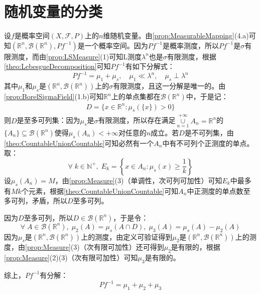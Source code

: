 \section{随机变量的分类}

设$f$是概率空间$(X,\mathscr{F},P)$上的$n$维随机变量。由\cref{prop:MeasurableMapping}(4.a)可知$(\mathbb{R}^{n},\mathcal{B}(\mathbb{R}^{n}),Pf^{-1})$是一个概率空间。因为$Pf^{-1}$是概率测度，所以$Pf^{-1}$是$\sigma$有限测度，而由\cref{prop:LSMeasure}(1)可知L测度$\lambda^n$也是$\sigma$有限测度，根据\cref{theo:LebesgueDecomposition}可知$Pf^{-1}$有如下分解式：
\begin{equation*}
	Pf^{-1}=\mu_1+\mu_s,\quad\mu_1\ll\lambda^n,\quad\mu_s\perp\lambda^n
\end{equation*}
其中$\mu_1$和$\mu_s$是$(\mathbb{R}^{n},\mathcal{B}(\mathbb{R}^{n}))$上的$\sigma$有限测度，且这一分解是唯一的。由\cref{prop:BorelSigmaField}(1.b)可知$\mathbb{R}^{n}$上的单点集都在$\mathcal{B}(\mathbb{R}^{n})$中，于是记：
\begin{gather*}
	D=\{x\in\mathbb{R}^{n}:\mu_s(\{x\})>0\}
\end{gather*}
则$D$是至多可列集：因为$\mu_s$是$\sigma$有限测度，所以存在满足$\underset{n=1}{\overset{+\infty}{\cup}}A_n=\mathbb{R}^{n}$的$\{A_n\}\subseteq\mathcal{B}(\mathbb{R}^{n})$使得$\mu_s(A_n)<+\infty$对任意的$n$成立。若$D$是不可列集，由\cref{theo:CountableUnionCountable}可知必然有一个$A_n$中有不可列个正测度的单点。取：
\begin{equation*}
	\forall\;k\in\mathbb{N}^+,\;E_k=\left\{x\in A_n:\mu_s(x)\geqslant\frac{1}{k}\right\}
\end{equation*}
设$\mu_s(A_n)=M$，由\cref{prop:Measure}(3)（单调性，次可列可加性）可知$E_k$中最多有$Mk$个元素，根据\cref{theo:CountableUnionCountable}可知$A_n$中正测度的单点数至多可列，矛盾，所以$D$至多可列。\par
因为$D$至多可列，所以$D\in\mathcal{B}(\mathbb{R}^{n})$，于是令：
\begin{equation*}
	\forall\;A\in\mathcal{B}(\mathbb{R}^{n}),\;\mu_2(A)=\mu_s(A\cap D),\;\mu_3(A)=\mu_s(A)-\mu_2(A)
\end{equation*}
因为$\mu_s$是$(\mathbb{R}^{n},\mathcal{B}(\mathbb{R}^{n}))$上的测度，由定义可验证得到$\mu_2$是$(\mathbb{R}^{n},\mathcal{B}(\mathbb{R}^{n}))$上的测度，由\cref{prop:Measure}(3)（次有限可加性）还可得到$\mu_2$是有限的，根据\cref{prop:Measure}(2)(3)（次有限可加性）可知$\mu_3$是有限的。\par
综上，$Pf^{-1}$有分解：
\begin{equation*}
	Pf^{-1}=\mu_1+\mu_2+\mu_3
\end{equation*}\par
